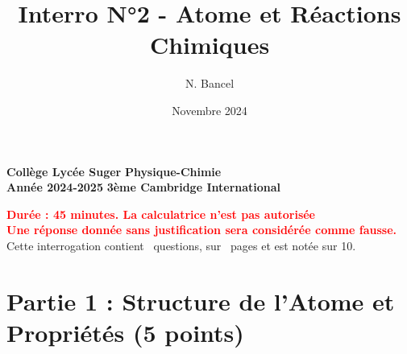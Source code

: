 \documentclass{exam}
\title{Interro N°2 - Atome et Réactions Chimiques}
\author{N. Bancel}
\date{Novembre 2024}
\begin{document}
\textbf{Collège Lycée Suger}
\hfill
\textbf{Physique-Chimie} \\

\textbf{Année 2024-2025}
\hfill
\textbf{3ème Cambridge International} \par

{\let\newpage\relax\maketitle}

\begin{center}
\textbf{\textcolor{red}{Durée : 45 minutes. La calculatrice n'est pas autorisée}} \\
\textbf{\textcolor{red}{Une réponse donnée sans justification sera considérée comme fausse.}} \\
Cette interrogation contient \numquestions\ questions, sur \numpages\ pages et est notée sur 10. 

\end{center}

\section*{Partie 1 : Structure de l'Atome et Propriétés (5 points)}
\end{document}
